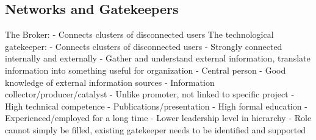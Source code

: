 \documentclass{scrartcl}
\begin{document}
\subsection*{Networks and Gatekeepers}
The Broker:
- Connects clusters of disconnected users
The technological gatekeeper:
- Connects clusters of disconnected users
- Strongly connected internally and externally
- Gather and understand external information, translate information into something useful for organization
- Central person
- Good knowledge of external information sources
- Information collector/producer/catalyst
- Unlike promoter, not linked to specific project
- High technical competence
- Publications/presentation
- High formal education
- Experienced/employed for a long time
- Lower leadership level in hierarchy
- Role cannot simply be filled, existing gatekeeper needs to be identified and supported
\end{document}
